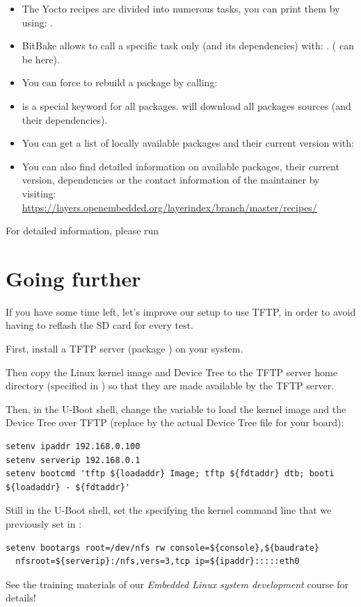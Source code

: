 \begin{itemize}
  \item The Yocto recipes are divided into numerous tasks, you can print them
        by using: .
  \item BitBake allows to call a specific task only (and its dependencies)
        with: . ( can be
         here).
  \item You can force to rebuild a package by calling: 
  \item {} is a special keyword for all packages.  will download all packages sources (and their
        dependencies).
  \item You can get a list of locally available packages and their current
        version with: \\
  \item You can also find detailed information on available packages, their
        current version, dependencies or the contact information of the
        maintainer by visiting: \\
        \url{https://layers.openembedded.org/layerindex/branch/master/recipes/}
\end{itemize}

For detailed information, please run 

\section{Going further}

If you have some time left, let's improve our setup to use TFTP, in
order to avoid having to reflash the SD card for every test.

First, install a TFTP server (package ) on your system.

Then copy the Linux kernel image and Device Tree to the TFTP server home
directory (specified in ) so that they are
made available by the TFTP server.

Then, in the U-Boot shell, change the  variable to load the
kernel image and the Device Tree over TFTP (replace  by
the actual Device Tree file for your board):

\small{
\begin{verbatim}
setenv ipaddr 192.168.0.100
setenv serverip 192.168.0.1
setenv bootcmd 'tftp ${loadaddr} Image; tftp ${fdtaddr} dtb; booti ${loadaddr} - ${fdtaddr}'
\end{verbatim}
}

Still in the U-Boot shell, set the  specifying the kernel command line that
we previously set in :

{\small
\begin{verbatim}
setenv bootargs root=/dev/nfs rw console=${console},${baudrate}
  nfsroot=${serverip}:/nfs,vers=3,tcp ip=${ipaddr}:::::eth0
\end{verbatim}
}

See the training materials of our {\em Embedded Linux system
  development} course for details!

